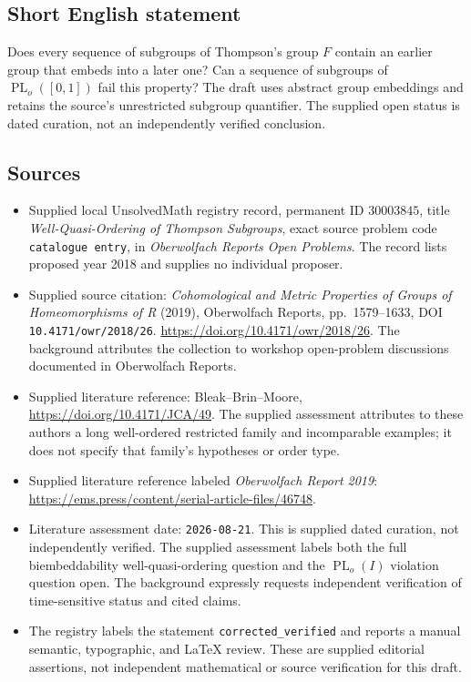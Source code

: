 \documentclass[11pt]{article}
\begin{document}
\subsection{Short English statement}
Does every sequence of subgroups of Thompson's group \(F\) contain an earlier group that embeds into a later one? Can a sequence of subgroups of \(\operatorname{PL}_o([0,1])\) fail this property? The draft uses abstract group embeddings and retains the source's unrestricted subgroup quantifier. The supplied open status is dated curation, not an independently verified conclusion.
\subsection{Sources}
\begin{itemize}
\item Supplied local UnsolvedMath registry record, permanent ID \(30003845\), title \emph{Well-Quasi-Ordering of Thompson Subgroups}, exact source problem code \texttt{catalogue entry}, in \emph{Oberwolfach Reports Open Problems}. The record lists proposed year 2018 and supplies no individual proposer.
\item Supplied source citation: \emph{Cohomological and Metric Properties of Groups of Homeomorphisms of R} (2019), Oberwolfach Reports, pp.~1579--1633, DOI \texttt{10.4171/owr/2018/26}. \url{https://doi.org/10.4171/owr/2018/26}. The background attributes the collection to workshop open-problem discussions documented in Oberwolfach Reports.
\item Supplied literature reference: Bleak--Brin--Moore, \url{https://doi.org/10.4171/JCA/49}. The supplied assessment attributes to these authors a long well-ordered restricted family and incomparable examples; it does not specify that family's hypotheses or order type.
\item Supplied literature reference labeled \emph{Oberwolfach Report 2019}: \url{https://ems.press/content/serial-article-files/46748}.
\item Literature assessment date: \texttt{2026-08-21}. This is supplied dated curation, not independently verified. The supplied assessment labels both the full biembeddability well-quasi-ordering question and the \(\operatorname{PL}_o(I)\) violation question open. The background expressly requests independent verification of time-sensitive status and cited claims.
\item The registry labels the statement \texttt{corrected\_verified} and reports a manual semantic, typographic, and LaTeX review. These are supplied editorial assertions, not independent mathematical or source verification for this draft.
\end{itemize}
\end{document}
